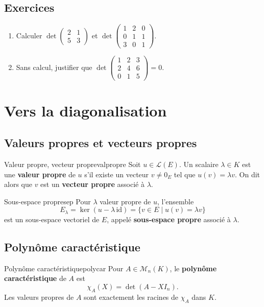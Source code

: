 \documentclass[theme=pringlea]{myrtille}
\begin{document}
\subsection{Exercices}
\begin{enumerate}
    \item Calculer $\det \begin{pmatrix} 2 & 1 \\ 5 & 3 \end{pmatrix}$ et $\det \begin{pmatrix} 1 & 2 & 0 \\ 0 & 1 & 1 \\ 3 & 0 & 1 \end{pmatrix}$.
    \item Sans calcul, justifier que $\det\begin{pmatrix} 1 & 2 & 3 \\ 2 & 4 & 6 \\ 0 & 1 & 5\end{pmatrix} = 0$.
\end{enumerate}


\section{Vers la diagonalisation}

\subsection{Valeurs propres et vecteurs propres}
\begin{myrdef}{Valeur propre, vecteur propre}{valpropre}
Soit $u \in \mathcal{L}(E)$. Un scalaire $\lambda \in K$ est une \textbf{valeur propre} de $u$ s'il existe un vecteur $v \neq 0_E$ tel que $u(v) = \lambda v$. On dit alors que $v$ est un \textbf{vecteur propre} associé à $\lambda$.
\end{myrdef}

\begin{myrdef}{Sous-espace propre}{sep}
Pour $\lambda$ valeur propre de $u$, l'ensemble
\[ E_\lambda = \ker(u - \lambda \,\mathrm{id}) = \{ v \in E \mid u(v) = \lambda v \} \]
est un sous-espace vectoriel de $E$, appelé \textbf{sous-espace propre} associé à $\lambda$.
\end{myrdef}

\subsection{Polynôme caractéristique}
\begin{myrdef}{Polynôme caractéristique}{polycar}
Pour $A \in \mathcal{M}_n(K)$, le \textbf{polynôme caractéristique} de $A$ est
\[ \chi_A(X) = \det(A - X I_n). \]
Les valeurs propres de $A$ sont exactement les racines de $\chi_A$ dans $K$.
\end{myrdef}
\end{document}
